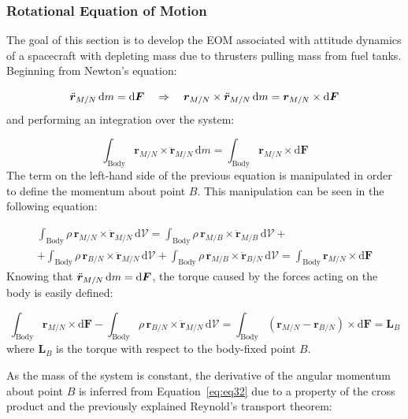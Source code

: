 \subsubsection{Rotational Equation of Motion}
The goal of this section is to develop the EOM associated with attitude dynamics of a spacecraft with depleting mass due to thrusters pulling mass from fuel tanks. Beginning from Newton's equation:

\begin{equation}
	\ddot{\bm{r}}_{M/N}\,\text{\text{d}}m=\text{d}\bm{F} \quad \Rightarrow \quad
	\bm{r}_{M/N} \times \ddot{\bm{r}}_{M/N}\,\text{d}m =\bm{r}_{M/N} \times \text{d}\bm{F}
\end{equation}
and performing an integration over the system:

\begin{equation}
	\int_{\text{Body}} \bm{r}_{M/N} \times \ddot{\bm{r}}_{M/N}\,\text{d}m = \int_{\text{Body}}\bm{r}_{M/N} \times \text{d}\bm{F}
\end{equation}
The term on the left-hand side of the previous equation is manipulated in order to define the momentum about point $B$. This manipulation can be seen in the following equation:

\begin{multline}\label{eq:eq32}
	\int_{\text{Body}} \rho\,\bm{r}_{M/N} \times \ddot{\bm{r}}_{M/N}\,\text{d}\mathcal{V} = \int_{\text{Body}} \rho\,\bm{r}_{M/B} \times \ddot{\bm{r}}_{M/B}\,\text{d}\mathcal{V} +\\ + \int_{\text{Body}} \rho\,\bm{r}_{B/N} \times \ddot{\bm{r}}_{M/N}\,\text{d}\mathcal{V} + \int_{\text{Body}} \rho\,\bm{r}_{M/B} \times \ddot{\bm{r}}_{B/N}\,\text{d}\mathcal{V} = \int_{\text{Body}}\bm{r}_{M/N} \times \text{d}\bm{F}
\end{multline}
Knowing that $\ddot{\bm{r}}_{M/N}\,\text{\text{d}}m=\text{d}\bm{F}$, the torque caused by the forces acting on the body is  easily defined:

\begin{equation}
	\int_{\text{Body}}\bm{r}_{M/N} \times \text{d}\bm{F}-\int_{\text{Body}}  \rho\,\bm{r}_{B/N} \times \ddot{\bm{r}}_{M/N}\,\text{d}\mathcal{V} 
	= \int_{\text{Body}} \left(\bm{r}_{M/N}-\bm{r}_{B/N}\right) \times \text{d}\bm{F} = \bm{L}_{B}
\end{equation}
\noindent
where $\bm{L}_{B}$ is the torque with respect to the body-fixed point $B$.

As the mass of the system is constant, the derivative of the angular momentum about point $B$ is inferred from Equation~\eqref{eq:eq32} due to a property of the cross product and the previously explained Reynold's transport theorem:

